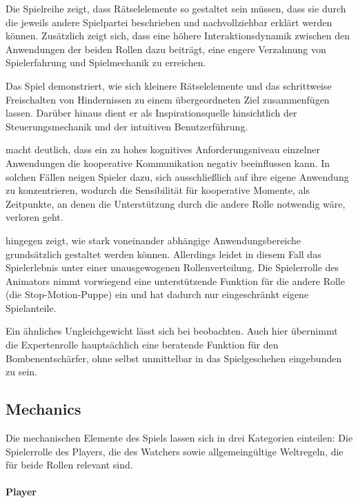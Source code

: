 Die Spielreihe  zeigt, dass Rätselelemente so gestaltet sein müssen, dass sie durch die jeweils andere Spielpartei beschrieben und nachvollziehbar erklärt werden können. Zusätzlich zeigt sich, dass eine höhere Interaktionsdynamik zwischen den Anwendungen der beiden Rollen dazu beiträgt, eine engere Verzahnung von Spielerfahrung und Spielmechanik zu erreichen.

Das Spiel  demonstriert, wie sich kleinere Rätselelemente und das schrittweise Freischalten von Hindernissen zu einem übergeordneten Ziel zusammenfügen lassen. Darüber hinaus dient er als Inspirationsquelle hinsichtlich der Steuerungsmechanik und der intuitiven Benutzerführung.

 macht deutlich, dass ein zu hohes kognitives Anforderungsniveau einzelner Anwendungen die kooperative Kommunikation negativ beeinflussen kann. In solchen Fällen neigen Spieler dazu, sich ausschließlich auf ihre eigene Anwendung zu konzentrieren, wodurch die Sensibilität für kooperative Momente, als Zeitpunkte, an denen die Unterstützung durch die andere Rolle notwendig wäre, verloren geht.

 hingegen zeigt, wie stark voneinander abhängige Anwendungsbereiche grundsätzlich gestaltet werden können. Allerdings leidet in diesem Fall das Spielerlebnis unter einer unausgewogenen Rollenverteilung. Die Spielerrolle des Animators nimmt vorwiegend eine unterstützende Funktion für die andere Rolle (die Stop-Motion-Puppe) ein und hat dadurch nur eingeschränkt eigene Spielanteile.

Ein ähnliches Ungleichgewicht lässt sich bei  beobachten. Auch hier übernimmt die Expertenrolle hauptsächlich eine beratende Funktion für den Bombenentschärfer, ohne selbst unmittelbar in das Spielgeschehen eingebunden zu sein.

\subsection{Mechanics}
Die mechanischen Elemente des Spiels lassen sich in drei Kategorien einteilen: Die Spielerrolle des Players, die des Watchers sowie allgemeingültige Weltregeln, die für beide Rollen relevant sind.

\paragraph{Player}

